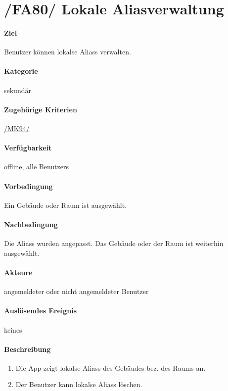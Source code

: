 \section[Lokale Aliasverwaltung]{/FA80/ Lokale Aliasverwaltung}
\label{/FA80/}
\paragraph{Ziel}
\Gls{Benutzer} können \glspl{lokal}e \Glspl{Alias} verwalten.
\paragraph{Kategorie}
sekundär
\paragraph{Zugehörige Kriterien}
\hyperref[/MK94/]{/MK94/}
\paragraph{Verfügbarkeit}
\gls{offline}, alle \Glspl{Benutzer}
\paragraph{Vorbedingung}
Ein Gebäude oder Raum ist ausgewählt.
\paragraph{Nachbedingung}
Die \Glspl{Alias} wurden angepasst. Das Gebäude oder der Raum ist weiterhin ausgewählt.
\paragraph{Akteure}
angemeldeter oder nicht angemeldeter \Gls{Benutzer}
\paragraph{Auslösendes Ereignis} keines
\paragraph{Beschreibung}
\begin{enumerate}
      \item Die App zeigt \glspl{lokal}e \Glspl{Alias} des Gebäudes bez. des Raums an.
      \item Der \Gls{Benutzer} kann \glspl{lokal}e \Glspl{Alias} löschen.
\end{enumerate}